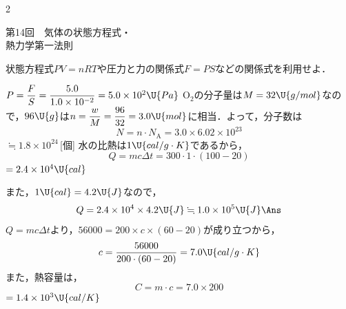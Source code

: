 \newpage

\setlength{\columnseprule}{0.4pt}
\begin{multicols}{2}
\raggedcolumns

{\gtfamily\large 第14回　気体の状態方程式・\\ 熱力学第一法則}\par\vspace{2mm}

\par\nopagebreak
\begin{sisin}
状態方程式$PV=nRT$や圧力と力の関係式$F=PS$などの関係式を利用せよ．
\end{sisin}
\par\nopagebreak
\begin{komon}
 $P=\dfrac{F}{S}=\dfrac{5.0}{1.0\times 10^{-2}}=5.0\times 10^2\U{Pa}$\Ans
{} $\mathrm{O_2}$の分子量は$M=32\U{g/mol}$なので，$96\U{g}$は$n=\dfrac{w}{M}=\dfrac{96}{32}=3.0\U{mol}$に相当．よって，分子数は
       \[N=n\cdot N_{\mathrm{A}}=3.0\times 6.02\times 10^{23}\]
       \hspace*{2zw}$\fallingdotseq 1.8\times 10^{24}$\,[個]\Ans
{} 水の比熱は$1\U{cal/g\cdot K}$であるから，
       \[Q=mc\Delta t=300\cdot 1\cdot(100-20)\]
       \hspace*{2zw}$=2.4\times 10^4\U{cal}$\par
       また，$1\U{cal}=4.2\U{J}$なので，
       \[Q=2.4\times 10^4\times 4.2\U{J}\fallingdotseq 1.0\times 10^5\U{J}\Ans\]
 $Q=mc\Delta t$より，$56000=200\times c\times(60-20)$が成り立つから，
       \[c=\frac{56000}{200\cdot(60-20)}=7.0\U{cal/g\cdot K}\]
       また，熱容量は，
       \[C=m\cdot c=7.0\times 200\]
       \hspace*{2zw}$=1.4\times 10^3\U{cal/K}$\Ans
\end{komon}


\end{multicols}
